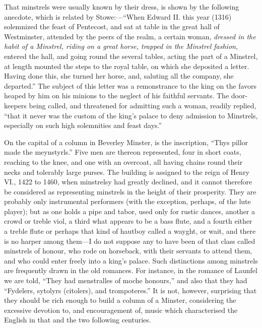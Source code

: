 That minstrels were usually known by their dress, is shown by the following
anecdote, which is related by Stowe:—“When Edward II. this year (1316)
solemnized the feast of Pentecost, and sat at table in the great hall of Westminster,
attended by the peers of the realm, a certain woman, \textit{dressed in the habit
of a Minstrel, riding on a great horse, trapped in the Minstrel fashion}, entered the
hall, and going round the several tables, acting the part of a Minstrel, at length
mounted the steps to the royal table, on which she deposited a letter. Having
done this, she turned her horse, and, saluting all the company, she departed.”
The subject of this letter was a remonstrance to the king on the favors heaped
by him on his minions to the neglect of his faithful servants. The door-keepers
being called, and threatened for admitting such a woman, readily replied, “that
it never was the custom of the king’s palace to deny admission to Minstrels,
especially on such high solemnities and feast days.”

On the capital of a column in Beverley Minster, is the inscription, “Thys
pillor made the meynstyrls.” Five men are thereon represented, four in short
coats, reaching to the knee, and one with an overcoat, all having chains round
their necks and tolerably large purses. The building is assigned to the reign of
Henry VI., 1422 to 1460, when minstrelsy had greatly declined, and it cannot
therefore be considered as representing minstrels in the height of their prosperity.
They are probably only instrumental performers (with the exception, perhaps, of
the lute player); but as one holds a pipe and tabor, used only for rustic dances,
another a crowd or treble viol, a third what appears to be a bass flute, and a
fourth either a treble flute or perhaps that kind of hautboy called a wayght, or
wait, and there is no harper among them—I do not suppose any to have been of
that class called minstrels of honour, \pagebreak 
who rode on horseback, with their servants
to attend them, and who could enter freely into a king’s palace. Such distinctions
among minstrels are frequently drawn in the old romances. For instance, in the
romance of Launfel we are told, “They had menstralles of moche honours,” and
also that they had “Fydelers, sytolyrs (citolers), and trompoteres.” It is not,
however, surprising that they should be rich enough to build a column of a
Minster, considering the excessive devotion to, and encouragement of, music which
characterised the English in that and the two following centuries.

